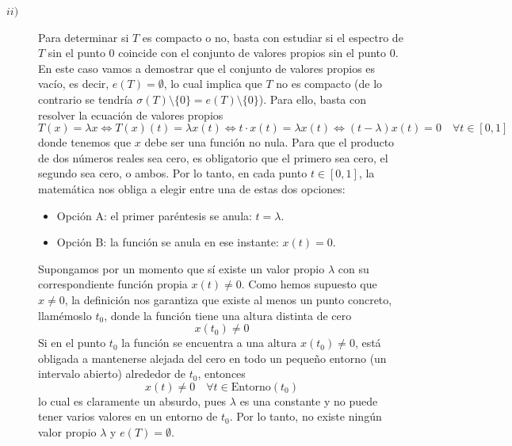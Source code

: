 \begin{ejercicio}
\begin{description}
        \item[$ii)$] Para determinar si $T$ es compacto o no, basta con estudiar si el espectro de $T$ sin el punto $0$ coincide con el conjunto de valores propios sin el punto $0$. En este caso vamos a demostrar que el conjunto de valores propios es vacío, es decir, $e(T) = \emptyset$, lo cual implica que $T$ no es compacto (de lo contrario se tendría $\sigma(T) \setminus \{0\} = e(T) \setminus \{0\}$). Para ello, basta con resolver la ecuación de valores propios 
        $$T(x) = \lambda x \iff T(x)(t) = \lambda x(t) \iff  t\cdot x(t) = \lambda x(t)\iff (t - \lambda) x(t) = 0 \quad \forall t\in [0,1]$$
        donde tenemos que $x$ debe ser una función no nula. Para que el producto de dos números reales sea cero, es obligatorio que el primero sea cero, el segundo sea cero, o ambos. Por lo tanto, en cada punto $t \in [0,1]$, la matemática nos obliga a elegir entre una de estas dos opciones:
        \begin{itemize}
            \item Opción A: el primer paréntesis se anula: $t = \lambda$.
            \item Opción B: la función se anula en ese instante: $x(t) = 0$.
        \end{itemize}
        Supongamos por un momento que sí existe un valor propio $\lambda$ con su correspondiente función propia $x(t) \neq 0$. Como hemos supuesto que $x \neq 0$, la definición nos garantiza que existe al menos un punto concreto, llamémoslo $t_0$, donde la función tiene una altura distinta de cero
        $$x(t_0) \neq 0$$
        Si en el punto $t_0$ la función se encuentra a una altura $x(t_0) \neq 0$, está obligada a mantenerse alejada del cero en todo un pequeño entorno (un intervalo abierto) alrededor de $t_0$, entonces
        $$x(t) \neq 0 \quad \forall t \in \text{Entorno}(t_0)$$
        lo cual es claramente un absurdo, pues $\lambda$ es una constante y no puede tener varios valores en un entorno de $t_0$. Por lo tanto, no existe ningún valor propio $\lambda$ y $e(T) = \emptyset$.
    \end{description}
\end{ejercicio}

